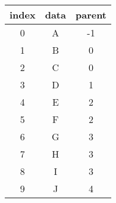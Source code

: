 \begin{frame}
\begin{small}
\begin{minipage}[t]{0.45\textwidth}
\begin{figure}
\centering
        
\end{figure}
\end{minipage}
\begin{minipage}[t]{0.45\textwidth}
\begin{table}
\begin{tabular}{c|c|c}\hline
 index & data & parent\\\hline
0&A&-1\\
1&B&0\\
2&C&0\\
3&D&1\\
4&E&2\\
5&F&2\\
6&G&3\\
7&H&3\\
8&I&3\\
9&J&4\\\hline
\end{tabular}
\end{table}
\end{minipage}
\end{small}
\end{frame}


